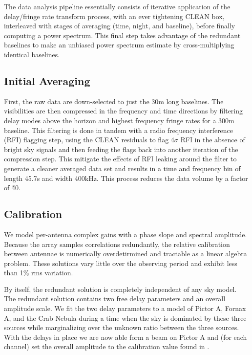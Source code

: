 \documentclass[preprint]{aastex}
\begin{document}
The data analysis pipeline essentially consists of iterative application of the delay/fringe rate transform process, with an ever tightening CLEAN box, interleaved with stages of averaging (time, night, and baseline), before finally computing a power spectrum.  This final step takes advantage of the redundant baselines to make an unbiased power spectrum estimate by cross-multiplying identical baselines.  


\subsection{Initial Averaging}
  First, the raw data are down-selected to just the 30m long baselines. %
   The visibilities are then compressed in the frequency and time directions by filtering delay modes above the horizon and highest frequency fringe rates for a 300m baseline.  This filtering is done in tandem with a radio frequency interference (RFI) flagging step, using the CLEAN residuals to flag 4$\sigma$ RFI in the absence of bright sky signals and then feeding the flags back into another iteration of the compression step. This mitigate the effects of RFI leaking around the filter to generate a cleaner averaged data set and results in a time and frequency bin of length 45.7s and width 400kHz. %
  This process reduces the data volume by a factor of \~40.
  
\subsection{Calibration}
We model per-antenna complex gains with a phase slope and spectral amplitude.  Because the array samples correlations redundantly, the relative calibration between antennae is numerically overdetirmined and tractable as a linear algebra problem.  These solutions vary little over the observing period and exhibit less than 1\% rms variation. %

By itself, the redundant solution is completely independent of any sky model. The redundant solution contains two free delay parameters and an overall amplitude scale. We fit the two delay parameters to a model of Pictor A, Fornax A, and the Crab Nebula during a time when the sky is dominated by these three sources while marginalizing over the unknown ratio between the three sources. With the delays in place we are now able form a beam on Pictor A and (for each channel) set the overall amplitude to the calibration value found in \cite{jacobs:2013b}.
  
\end{document}
